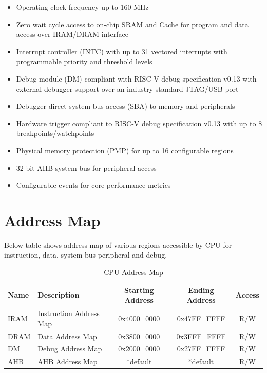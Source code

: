 \documentclass[main\_\_EN.tex]{subfiles}
\begin{document}
\begin{itemize}

    \item Operating clock frequency up to 160 MHz
    \item Zero wait cycle access to on-chip SRAM and Cache for program and data access over IRAM/DRAM interface
    \item Interrupt controller (INTC) with up to 31 vectored interrupts with programmable priority and threshold levels
    \item Debug module (DM) compliant with RISC-V debug specification v0.13 with external debugger support over an industry-standard JTAG/USB port
    \item Debugger direct system bus access (SBA) to memory and peripherals
    \item Hardware trigger compliant to RISC-V debug specification v0.13 with up to 8 breakpoints/watchpoints
    \item Physical memory protection (PMP) for up to 16 configurable regions
    \item 32-bit AHB system bus for peripheral access
    \item Configurable events for core performance metrics
    
\end{itemize}


\section{Address Map}

Below table shows address map of various regions accessible by CPU for instruction, data, system bus peripheral and debug.

\begin{longtable}{| l| l |c | c | c  |}
\caption{CPU Address Map} \label{tab:riscvcpu-mem-blocks}
\\ \hline
\rowcolor{lightgray}
Name & Description    &  Starting Address  &  Ending Address  & Access   \\ \hline
IRAM\label{TBD1} & Instruction Address Map  &   0x4000\_0000  &  0x47FF\_FFFF  &  R/W  \\ \hline
DRAM\label{TBD2} & Data Address Map &     0x3800\_0000  &  0x3FFF\_FFFF  &  R/W  \\ \hline
DM \label{TBD4} & Debug Address Map  &      0x2000\_0000  &  0x27FF\_FFFF  &  R/W  \\ \hline
AHB\label{TBD3} & AHB Address Map &      *default  &  *default  &  R/W  \\ \hline
\end{longtable}
\end{document}
